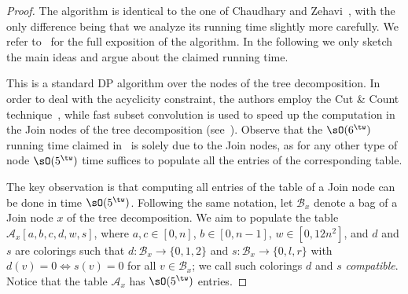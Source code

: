 \begin{proof}
    The algorithm is identical to the one of Chaudhary and Zehavi~\cite{wg/ChaudharyZ23a},
    with the only difference being that we analyze its running time slightly more carefully.
    We refer to~\cite[Section~6]{arxiv/ChaudharyZ23} for the full exposition of the algorithm.
    In the following we only sketch the main ideas and argue about the claimed running time.

    This is a standard DP algorithm over the nodes of the tree decomposition.
    In order to deal with the acyclicity constraint, the authors employ the Cut \& Count technique~\cite{talg/CyganNPPRW22},
    while fast subset convolution is used to speed up the computation in the Join nodes of the tree decomposition (see~\cite[Chapter~11]{books/CyganFKLMPPS15}).
    Observe that the $\sO(6^{\tw})$ running time claimed in~\cite{wg/ChaudharyZ23a} is solely due to the Join nodes,
    as for any other type of node $\sO(5^{\tw})$ time suffices to populate all the entries of the corresponding table.

    The key observation is that computing all entries of the table of a Join node can be done in time $\sO(5^{\tw})$.
    Following the same notation, let $\mathcal{B}_x$ denote a bag of a Join node $x$ of the tree decomposition.
    We aim to populate the table $\mathcal{A}_x[a,b,c,d,w,s]$, where $a,c \in [0,n]$, $b \in [0,n-1]$,
    $w \in [0,12n^2]$,
    and $d$ and $s$ are colorings such that $d \colon \mathcal{B}_x \to \{0,1,2\}$ and $s \colon \mathcal{B}_x \to \{0,l,r\}$
    with $d(v) = 0 \iff s(v) = 0$ for all $v \in \mathcal{B}_x$; we call such colorings $d$ and $s$ \emph{compatible}.
    Notice that the table $\mathcal{A}_x$ has $\sO(5^{\tw})$ entries.


\end{proof}
